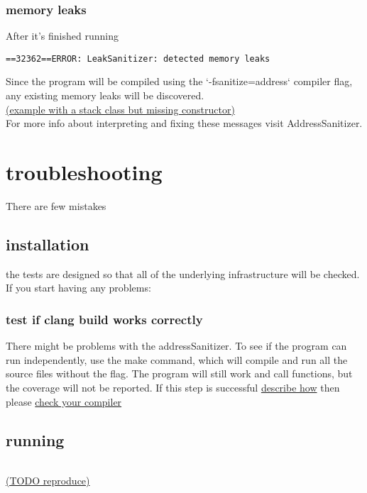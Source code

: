 \documentclass{elteikthesis}[2018/06/06]
\begin{document}
\subsubsection{memory leaks}
\label{sec-2-4-4-2}
After it's finished running \\
\begin{verbatim}
==32362==ERROR: LeakSanitizer: detected memory leaks
\end{verbatim}
Since the program will be compiled using the `-fsanitize=address` compiler flag, any existing memory leaks will be discovered. \\
\uline{(example with a stack class but missing constructor)} \\
For more info about interpreting and fixing these messages visit AddressSanitizer. \\
\section{troubleshooting}
\label{sec-2-5}
There are few mistakes \\
\subsection{installation}
\label{sec-2-5-1}
the tests are designed so that all of the underlying infrastructure will be checked. If you start having any problems: \\
\subsubsection{test if clang build works correctly}
\label{sec-2-5-1-1}
There might be problems with the addressSanitizer. To see if the program can run independently, use the make command, which will compile and run all the source files without the flag. The program will still work and call functions, but the coverage will not be reported. If this step is successful \uline{describe how} then please \uline{check your compiler} \\
\subsection{running}
\label{sec-2-5-2}
\begin{center}
\begin{tabular}{}
\\
\end{tabular}
\end{center}
\uline{(TODO reproduce)} \\
\begin{center}
\begin{tabular}{}
\\
\end{tabular}
\end{center}
\end{document}
